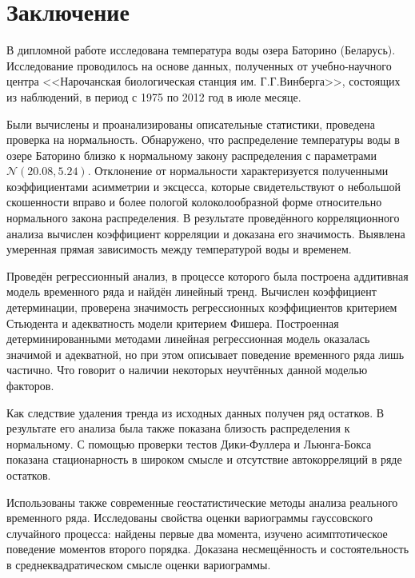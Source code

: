 
\chapter*{Заключение}

В дипломной работе исследована температура воды озера Баторино (Беларусь). Исследование проводилось на основе данных, полученных от учебно-научного центра <<Нарочанская биологическая станция им. Г.Г.Винберга>>, состоящих из наблюдений, в период с 1975 по 2012 год в июле месяце.

Были вычислены и проанализированы описательные статистики, проведена проверка на нормальность. Обнаружено, что распределение температуры воды в озере Баторино близко к нормальному закону распределения с параметрами $ \mathcal{N}(20.08, 5.24) $. Отклонение от нормальности характеризуется полученными коэффициентами асимметрии и эксцесса, которые свидетельствуют о небольшой скошенности вправо и более пологой колоколообразной форме относительно нормального закона распределения. В результате проведённого корреляционного анализа вычислен коэффициент корреляции и доказана его значимость. Выявлена умеренная прямая зависимость между температурой воды и временем.

Проведён регрессионный анализ, в процессе которого была построена аддитивная модель временного ряда и найдён линейный тренд. Вычислен коэффициент детерминации, проверена значимость регрессионных коэффициентов критерием Стьюдента и адекватность модели критерием Фишера. Построенная детерминированными методами линейная регрессионная модель оказалась значимой и адекватной, но при этом описывает поведение временного ряда лишь частично. Что говорит о наличии некоторых неучтённых данной моделью факторов.

Как следствие удаления тренда из исходных данных получен ряд остатков. В результате его анализа была также показана близость распределения к нормальному. С помощью проверки тестов Дики-Фуллера и Льюнга-Бокса показана стационарность в широком смысле и отсутствие автокорреляций в ряде остатков.

Использованы также современные геостатистические методы анализа реального временного ряда. Исследованы свойства оценки вариограммы гауссовского случайного процесса: найдены первые два момента, изучено асимптотическое поведение моментов второго порядка. Доказана несмещённость и состоятельность в среднеквадратическом смысле оценки вариограммы.

